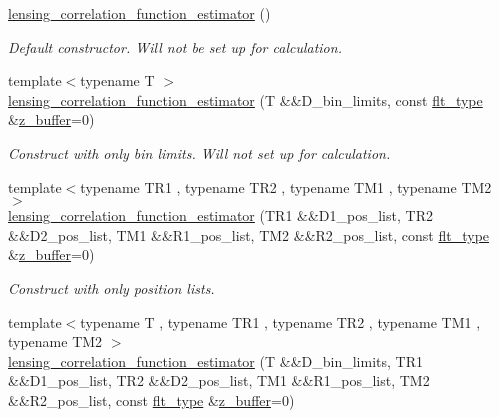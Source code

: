 \begin{DoxyCompactItemize}
\item 
\hyperlink{classIceBRG_1_1lensing__correlation__function__estimator_a7297428c28def8afef1063a35fc19e73}{lensing\+\_\+correlation\+\_\+function\+\_\+estimator} ()
\begin{DoxyCompactList}\small\item\em Default constructor. Will not be set up for calculation. \end{DoxyCompactList}\item 
{\footnotesize template$<$typename T $>$ }\\\hyperlink{classIceBRG_1_1lensing__correlation__function__estimator_a96ce3b043c0e55bfcf75f18c2843c950}{lensing\+\_\+correlation\+\_\+function\+\_\+estimator} (T \&\&D\+\_\+bin\+\_\+limits, const \hyperlink{lib_2IceBRG__main_2common_8h_ad0f130a56eeb944d9ef2692ee881ecc4}{flt\+\_\+type} \&\hyperlink{magic__values_8hpp_a424f49a8036e9de5962c718fb785356f}{z\+\_\+buffer}=0)
\begin{DoxyCompactList}\small\item\em Construct with only bin limits. Will not set up for calculation. \end{DoxyCompactList}\item 
{\footnotesize template$<$typename T\+R1 , typename T\+R2 , typename T\+M1 , typename T\+M2 $>$ }\\\hyperlink{classIceBRG_1_1lensing__correlation__function__estimator_a671269915830f2a76ab95073448d6ec0}{lensing\+\_\+correlation\+\_\+function\+\_\+estimator} (T\+R1 \&\&D1\+\_\+pos\+\_\+list, T\+R2 \&\&D2\+\_\+pos\+\_\+list, T\+M1 \&\&R1\+\_\+pos\+\_\+list, T\+M2 \&\&R2\+\_\+pos\+\_\+list, const \hyperlink{lib_2IceBRG__main_2common_8h_ad0f130a56eeb944d9ef2692ee881ecc4}{flt\+\_\+type} \&\hyperlink{magic__values_8hpp_a424f49a8036e9de5962c718fb785356f}{z\+\_\+buffer}=0)
\begin{DoxyCompactList}\small\item\em Construct with only position lists. \end{DoxyCompactList}\item 
{\footnotesize template$<$typename T , typename T\+R1 , typename T\+R2 , typename T\+M1 , typename T\+M2 $>$ }\\\hyperlink{classIceBRG_1_1lensing__correlation__function__estimator_a5a8fdec85a0d6251e7578635b313157b}{lensing\+\_\+correlation\+\_\+function\+\_\+estimator} (T \&\&D\+\_\+bin\+\_\+limits, T\+R1 \&\&D1\+\_\+pos\+\_\+list, T\+R2 \&\&D2\+\_\+pos\+\_\+list, T\+M1 \&\&R1\+\_\+pos\+\_\+list, T\+M2 \&\&R2\+\_\+pos\+\_\+list, const \hyperlink{lib_2IceBRG__main_2common_8h_ad0f130a56eeb944d9ef2692ee881ecc4}{flt\+\_\+type} \&\hyperlink{magic__values_8hpp_a424f49a8036e9de5962c718fb785356f}{z\+\_\+buffer}=0)

\end{DoxyCompactItemize}
